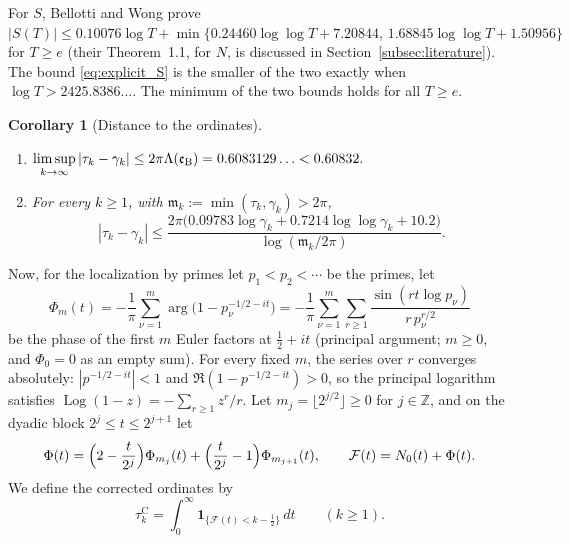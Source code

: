 \documentclass[11pt,a4paper]{article}
\makeatletter
\numberwithin{equation}{section}
\DeclareRobustCommand{\CGref}[1]{\ref{#1}}
\DeclareRobustCommand{\CGeqref}[1]{\eqref{#1}}
\DeclareRobustCommand{\CGcite}[2][]{\if\relax\detokenize{#1}\relax\cite{#2}\else\cite[#1]{#2}\fi}
\let\CG@origref\ref
\let\CG@origeqref\eqref
\newcommand{\CG@gettip}[1]{\@ifundefined{CGTip@#1}{#1}{\csname CGTip@#1\endcsname}}
\newcommand{\CG@getbib}[1]{\@ifundefined{CGBib@#1}{#1}{\csname CGBib@#1\endcsname}}
\DeclareRobustCommand{\CGref}[1]{\pdftooltip{\CG@origref{#1}}{\CG@gettip{#1}}}
\DeclareRobustCommand{\CGeqref}[1]{\pdftooltip{\CG@origeqref{#1}}{\CG@gettip{#1}}}
\DeclareRobustCommand{\CGcite}[2][]{\pdftooltip{\if\relax\detokenize{#1}\relax\cite{#2}\else\cite[#1]{#2}\fi}{\CG@getbib{#2}}}
\newtheorem{corollary}[theorem]{Corollary}
\theoremstyle{definition}
\theoremstyle{remark}
\newcommand{\Nz}{N_0} %
\newcommand{\Fc}{\mathcal F}
\newcommand{\Ph}{\Phi}
\newcommand{\Ind}{\mathbf 1}
\newcommand{\eB}{\mathfrak e_{\rm B}}
\newcommand{\Z}{\mathbb Z}
\makeatother
\begin{document}
\par
For $S$, Bellotti and Wong \CGcite[Cor.~1.5]{BellottiWong2025} prove $|S(T)|\le0.10076\log T+\min\{0.24460\log\log T+7.20844,\,1.68845\log\log T+1.50956\}$ for $T\ge e$ (their Theorem~1.1, for $N$, is discussed in Section~\CGref{subsec:literature}). The bound \CGeqref{eq:explicit_S} is the smaller of the two exactly when $\log T>2425.8386\ldots$. The minimum of the two bounds holds for all $T\ge e$.

\begin{corollary}[Distance to the ordinates]\label{cor:distance}
\begin{enumerate}[label=(\alph*)]
\item $\displaystyle\limsup_{k\to\infty}|\tau_k-\gamma_k|\le2\pi\Lambda(\eB)=0.6083129\ldots<0.60832 .$
\item For every $k\ge1$, with $\mathfrak m_k:=\min(\tau_k,\gamma_k)>2\pi$,
\begin{equation}
|\tau_k-\gamma_k|\le\frac{2\pi\bigl(0.09783\log\gamma_k+0.7214\log\log\gamma_k+10.2\bigr)}{\log(\mathfrak m_k/2\pi)} .
\label{eq:distance_explicit}
\end{equation}
\end{enumerate}
\end{corollary}

Now, for the localization by primes let $p_1<p_2<\cdots$ be the primes, let
\begin{equation}
\Ph_m(t)=-\frac1\pi\sum_{\nu=1}^m\arg\bigl(1-p_\nu^{-1/2-it}\bigr)=-\frac1\pi\sum_{\nu=1}^m\sum_{r\ge1}\frac{\sin(rt\log p_\nu)}{r\,p_\nu^{r/2}}
\label{eq:Euler_phase}
\end{equation}
be the phase of the first $m$ Euler factors at $\frac12+it$ (principal argument; $m\ge0$, and $\Ph_0=0$ as an empty sum). For every fixed $m$, the series over $r$ converges absolutely: $|p^{-1/2-it}|<1$ and $\Re(1-p^{-1/2-it})>0$, so the principal logarithm satisfies $\operatorname{Log}(1-z)=-\sum_{r\ge1}z^r/r$. Let $m_j=\lfloor2^{j/2}\rfloor\ge0$ for $j\in\Z$, and on the dyadic block $2^j\le t\le2^{j+1}$ let
\begin{equation}
\Ph(t)=\Bigl(2-\frac t{2^j}\Bigr)\Ph_{m_j}(t)+\Bigl(\frac t{2^j}-1\Bigr)\Ph_{m_{j+1}}(t),\qquad \Fc(t)=\Nz(t)+\Ph(t).
\label{eq:F_def}
\end{equation}
We define the corrected ordinates by
\begin{equation}
\tau_{k}^{\mathrm C}=\int_0^\infty\Ind_{\{\Fc(t)<k-\frac12\}}\,dt\qquad(k\ge1).
\label{eq:xk_def}
\end{equation}
\end{document}

